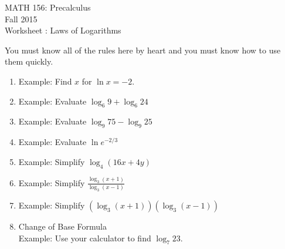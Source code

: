 \documentclass[11pt]{article}
\newcommand{\sect}{\textsection}
\begin{document}
 

\begin{center}MATH 156: Precalculus  \\ Fall 2015 \\ Worksheet \sect 4.4: Laws of Logarithms\end{center}

\hrulefill

You must know all of the rules here by heart and you must know how to use them quickly.\\

\hrulefill

\begin{enumerate}
\item
\setlength{\fboxsep}{15pt}
 \hfill Example: Find $x$ for $\ln x = -2.$
\vfill

\item 
\setlength{\fboxsep}{15pt}
 \hfill Example: Evaluate $\log_6 9+\log_6 24$
\vfill


\item 
\setlength{\fboxsep}{15pt}
 \hfill Example: Evaluate $\log_9 75 - \log_9 25$
\vfill


\item 
\setlength{\fboxsep}{15pt}
 \hfill Example: Evaluate $\ln e^{-2/3}$
\vfill



\item 
\setlength{\fboxsep}{15pt}
 \hfill Example: Simplify $\log_4 (16x +  4y)$
\vfill


\item 
\setlength{\fboxsep}{15pt}
 \hfill Example: Simplify $\frac{\log_3(x+1)}{\log_3(x-1)}$
\vfill


\item 
\setlength{\fboxsep}{15pt}
 \hfill Example: Simplify $\left(\log_3(x+1)\right)\left(\log_3(x-1)\right)$
\vfill

\newpage
\item Change of Base Formula\\
\setlength{\fboxsep}{15pt}
 \hfill Example: Use your calculator to find $\log_7 23.$
\vfill
\end{enumerate}
\end{document}
